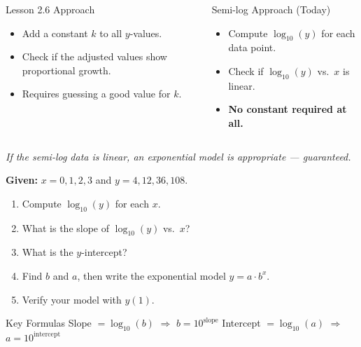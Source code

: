 \documentclass[aspectratio=169, 11pt]{beamer}
\begin{document}
\begin{frame}[t, plain]
  \vspace{0.3cm}
  \begin{columns}
    \begin{block}{Lesson 2.6 Approach}
      \begin{itemize}
        \setlength{\itemsep}{6pt}
        \item Add a constant $k$ to all $y$-values.
        \item Check if the adjusted values show proportional growth.
        \item Requires guessing a good value for $k$.
      \end{itemize}
    \end{block}
    \begin{block}{Semi-log Approach (Today)}
      \begin{itemize}
        \setlength{\itemsep}{6pt}
        \item Compute $\log_{10}(y)$ for each data point.
        \item Check if $\log_{10}(y)$ vs.\ $x$ is linear.
        \item \textbf{No constant required at all.}
      \end{itemize}
    \end{block}
  \end{columns}
  \vspace{0.3cm}
  \centering
  \textit{If the semi-log data is linear, an exponential model is appropriate --- guaranteed.}
\end{frame}

\begin{frame}[t, plain]
  \vspace{0.2cm}
  \textbf{Given:} $x = 0,1,2,3$ and $y = 4, 12, 36, 108$.
  \vspace{0.2cm}
  \begin{enumerate}
    \setlength{\itemsep}{8pt}
    \item Compute $\log_{10}(y)$ for each $x$.
    \item What is the slope of $\log_{10}(y)$ vs.\ $x$?
    \item What is the $y$-intercept?
    \item Find $b$ and $a$, then write the exponential model $y = a\cdot b^x$.
    \item Verify your model with $y(1)$.
  \end{enumerate}
  \vspace{0.3cm}
  \begin{block}{Key Formulas}
    Slope $= \log_{10}(b)$ \quad $\Rightarrow$ \quad $b = 10^{\text{slope}}$
    \qquad
    Intercept $= \log_{10}(a)$ \quad $\Rightarrow$ \quad $a = 10^{\text{intercept}}$
  \end{block}
\end{frame}
\end{document}
